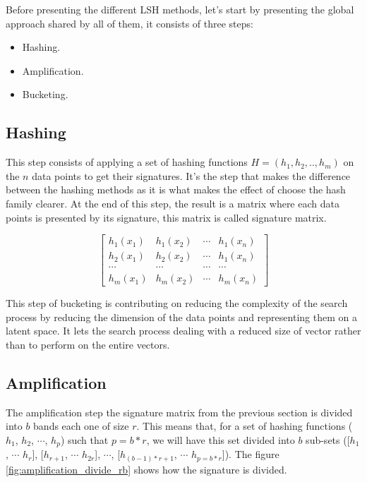 Before presenting the different LSH methods, let's start by presenting the
global approach shared by all of them, it consists of three steps:
\begin{itemize}
    \item Hashing.
    \item Amplification.
    \item Bucketing.
\end{itemize}

\subsection{Hashing}
This step consists of applying a set of hashing functions $H = (h_1, h_2, ..,
    h_m)$ on the $n$ data points to get their \glspl{signature}. It's the step that
makes the difference between the hashing methods as it is what makes the
effect of choose the hash family clearer. At the end of this step, the
result is a matrix where each data points is presented by its signature,
this matrix is called signature matrix.

$$\begin{bmatrix} h_1 (x_1) & h_1 (x_2) & \cdots & h_1 (x_n) \\
        h_2 (x_1) & h_2 (x_2) & \cdots & h_1 (x_n) \\
        \cdots    & \cdots    & \cdots & \cdots    \\
        h_m (x_1) & h_m (x_2) & \cdots & h_m (x_n)\end{bmatrix}$$

This step of bucketing is contributing on reducing the complexity of the search
process by reducing the dimension of the data points and representing them on a
latent space. It lets the search process dealing with a reduced size of vector
rather than to perform on the entire vectors.

\subsection{Amplification}
The amplification step the signature matrix from the previous section is divided
into $b$ bands each one of size $r$. This means that, for a set of hashing
functions ($h_1$, $h_2$, $\cdots$, $h_p$) such that $p = b*r$, we will have this
set divided into $b$ sub-sets ([$h_{1}$, $\cdots$ $h_{r}$], [$h_{r+1}$, $\cdots$
        $h_{2r}$], $\cdots$, [$h_{(b-1)*r + 1}$, $\cdots$ $h_{p = b*r}$]). The figure
\ref{fig:amplification_divide_rb} shows how the signature is divided.

